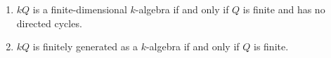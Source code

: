 \begin{enumerate}[label=(\alph*)]
	\item $kQ$ is a finite-dimensional $k$-algebra if and only if $Q$ is finite
		and has no directed cycles.
	\item $kQ$ is finitely generated as a $k$-algebra if and only if $Q$ is finite.
\end{enumerate}
